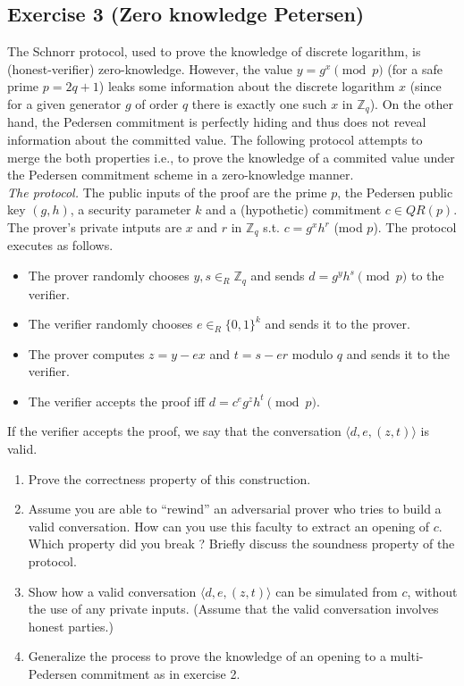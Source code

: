 \subsection{Exercise 3 (Zero knowledge Petersen)}
The Schnorr protocol, used to prove the knowledge of discrete
logarithm, is (honest-verifier) zero-knowledge. However, the value
$y=g^x \pmod{p}$ (for a safe prime $p=2q+1$) leaks some information
about the discrete logarithm $x$ (since for a given generator $g$ of
order $q$ there is exactly one such $x$ in $\mathbb{Z}_q$). On the
other hand, the Pedersen commitment is perfectly hiding and thus does
not reveal information about the committed value. The following
protocol attempts to merge the both properties i.e., to prove the
knowledge of a commited value under the Pedersen commitment scheme in
a zero-knowledge manner.
\\
\indent \emph{The protocol.} The public inputs of the proof are the prime $p$,
the Pedersen public key $(g, h)$, a security parameter $k$ and a
(hypothetic) commitment $c\in QR(p)$. The prover's private intputs are
$x$ and $r$ in $\mathbb{Z}_q$ s.t. $c=g^xh^r$ (mod $p$). The protocol executes as follows. 
\begin{itemize}
	\item The prover randomly chooses $y,s \in_R \mathbb{Z}_q$ and sends $d=g^yh^s  \pmod{p}$ to the verifier.
	\item The verifier randomly chooses $e\in_R \{0,1\}^k$ and sends it to the prover.
	\item The prover computes $z=y-ex$ and  $t=s-er$ modulo $q$ and sends it to the verifier.
	\item The verifier accepts the proof iff $d = c^e g^zh^t
          \pmod{p}$.
\end{itemize}
If the verifier accepts the proof, we say that the conversation $\langle d,e,(z,t) \rangle$ is valid.
%
\begin{enumerate}
	\item Prove the correctness property of this construction.
	\item Assume you are able to ``rewind'' an adversarial prover
          who tries to build a valid conversation. How can you use
          this faculty to extract an opening of $c$. Which property
          did you break ? Briefly discuss the soundness property of
          the protocol.

          	\item Show how a valid conversation $\langle
          d,e,(z,t) \rangle$ can be simulated from $c$, without the use of any
          private inputs. (Assume that the valid conversation involves
          honest parties.)
	\item Generalize the process to prove the knowledge of an opening to 
	        a multi-Pedersen commitment as in exercise 2.
\end{enumerate}

